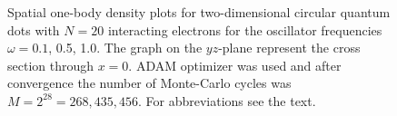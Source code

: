 \begin{landscape}
\begin{figure} [H]
		\caption{Spatial one-body density plots for two-dimensional circular quantum dots with $N=20$ interacting electrons for the oscillator frequencies $\omega=0.1$, 0.5, 1.0. The graph on the $yz$-plane represent the cross section through $x=0$. ADAM optimizer was used and after convergence the number of Monte-Carlo cycles was $M=2^{28}=268,435,456$. For abbreviations see the text.}%
		\label{fig:OB2_interaction_20P}
	\end{figure}
	\begin{figure} [H]%
		\centering
		\captionsetup[subfigure]{labelformat=empty}
		\captionsetup{width=0.9\hsize}
		\hspace{0.1cm}
		\hspace{-0.0cm}
		\hspace{-0.0cm}
		\hspace{-0.0cm}
		\\ [-0.3cm]
		

\end{figure}
\end{landscape}
